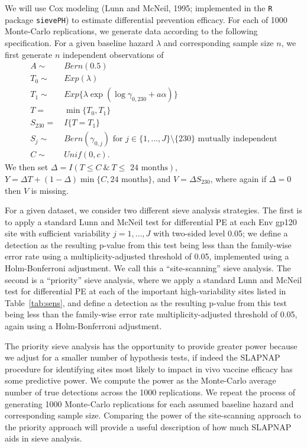 \documentclass[10pt]{article}
\begin{document}
We will use Cox modeling (Lunn and McNeil, 1995; implemented in the \texttt{R} package \texttt{sievePH}) to estimate differential prevention efficacy. For each of 1000 Monte-Carlo replications, we generate data according to the following specification. For a given baseline hazard $\lambda$ and corresponding sample size $n$, we first generate $n$ independent observations of
\begin{align*}
  A \sim & \ Bern(0.5) \\
  T_0 \sim & \ Exp(\lambda) \\
  T_1 \sim & \ Exp\{\lambda\exp(\log \gamma_{0,230} + a \alpha)\} \\
  T =& \ \min\{T_0, T_1\} \\
  S_{230} =& \ I\{T = T_1\} \\
  S_j \sim & \ Bern(\gamma_{0,j}) \text{ for } j \in \{1, \ldots, J\} \setminus \{230\} \text{ mutually independent} \\
  C \sim & \ Unif(0, c).
\end{align*}
We then set $\Delta = I(T \leq C \ \& \ T \leq \text{ 24 months})$, $Y = \Delta T + (1 - \Delta) \min\{C, 24 \text{ months}\}$, and $V = \Delta S_{230}$, where again if $\Delta = 0$ then $V$ is missing.

For a given dataset, we consider two different sieve analysis strategies. The first is to apply a standard Lunn and McNeil test for differential PE at each Env gp120 site with sufficient variability $j = 1, \ldots, J$ with two-sided level 0.05; we define a detection as the resulting p-value from this test being less than the family-wise error rate using a multiplicity-adjusted threshold of 0.05, implemented using a Holm-Bonferroni adjustment. We call this a ``site-scanning'' sieve analysis. The second is a ``priority'' sieve analysis, where we apply a standard Lunn and McNeil test for differential PE at each of the important high-variability sites listed in Table~\ref{tab:sens}, and define a detection as the resulting p-value from this test being less than the family-wise error rate multiplicity-adjusted threshold of 0.05, again using a Holm-Bonferroni adjustment.

The priority sieve analysis has the opportunity to provide greater power because we adjust for a smaller number of hypothesis tests, if indeed the SLAPNAP procedure for identifying sites most likely to impact in vivo vaccine efficacy has some predictive power. We compute the power as the Monte-Carlo average number of true detections across the 1000 replications. We repeat the process of generating 1000 Monte-Carlo replications for each assumed baseline hazard and corresponding sample size. Comparing the power of the site-scanning approach to the priority approach will provide a useful description of how much SLAPNAP aids in sieve analysis.
\end{document}
